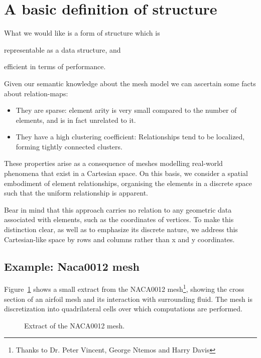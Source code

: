 
\section{A basic definition of structure}
What we would like is a form of structure which is
\begin{enumerate*}[label=\alph*)]
\item representable as a data structure, and \item efficient in terms of performance.
\end{enumerate*}

Given our semantic knowledge about the mesh model we can ascertain some facts about relation-maps:
\begin{itemize}
\item They are sparse: element arity is very small compared to the number of elements, and is in fact unrelated to it.
\item They have a high clustering coefficient: Relationships tend to be localized, forming tightly connected clusters.
\end{itemize}

These properties arise as a consequence of meshes modelling real-world phenomena that exist in a Cartesian space.
On this basis, we consider a spatial embodiment of element relationships, organising the elements in a discrete space such that the uniform relationship is apparent.

Bear in mind that this approach carries no relation to any geometric data associated with elements, such as the coordinates of vertices. To make this distinction clear, as well as to emphasize its discrete nature, we address this Cartesian-like space by rows and columns rather than x and y coordinates.

\subsection{Example: Naca0012 mesh}
Figure~\ref{fig:naca12-plain} shows a small extract from the NACA0012 mesh\footnote{Thanks to Dr. Peter Vincent, George Ntemos and Harry Davis}, showing the cross section of an airfoil mesh and its interaction with surrounding fluid. The mesh is discretization into quadrilateral cells over which computations are performed.

\newcommand{\drawnaca}[4]{
	\begin{figure}
	
	\caption{#3}
	\label{#4}
	\end{figure}
}
\drawnaca{images/defining-structure/}{naca0012-plain}{Extract of the NACA0012 mesh.}{fig:naca12-plain}

